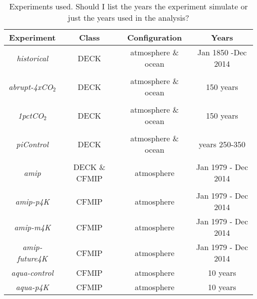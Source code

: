 \documentclass[draft]{agujournal2019}
\begin{document}
 \begin{table}
\begin{center}
\caption{Experiments used.   Should I list the years the experiment simulate or just the years used in the analysis?}
    \begin{tabular}{*{4}{c}}
    \hline
    \hline
 Experiment & Class & Configuration & Years   \\ \hline
    \textit{historical}        &   DECK      &  atmosphere \& ocean   &  Jan 1850 -Dec 2014               \\ 
    \\
    \textit{abrupt-4xCO$_2$}   & DECK       &  atmosphere \& ocean       & 150 years  \\  
    \\
    \textit{1pctCO$_2$}   & DECK        &  atmosphere \& ocean  & 150 years \\  
    \\
    \textit{piControl}  & DECK   &  atmosphere \& ocean  &   years 250-350  \\  
    \\
    \textit{amip}  & DECK \& CFMIP   &  atmosphere   & Jan 1979 - Dec 2014  \\  
    \\
    \textit{amip-p4K}  & CFMIP       &  atmosphere   & Jan 1979 - Dec 2014  \\ 
    \textit{amip-m4K}   & CFMIP       &  atmosphere   & Jan 1979 - Dec 2014 \\ 
    \textit{amip-future4K}  & CFMIP  & atmosphere & Jan 1979 - Dec 2014 \\
    \textit{aqua-control}        & CFMIP  & atmosphere  & 10 years \\
    \textit{aqua-p4K}  & CFMIP    & atmosphere  &  10 years \\ \hline

    \end{tabular}\par
    \label{tab:exps}
\end{center}
\end{table}
\end{document}
